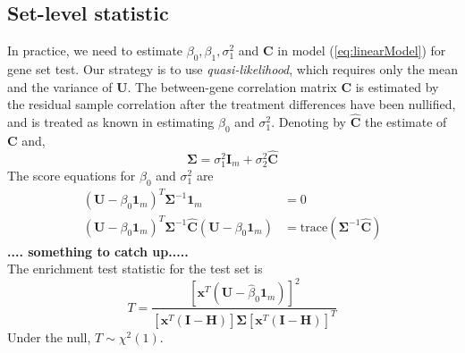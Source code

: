 \documentclass[11pt, a4paper]{article}
\begin{document}
	\subsection*{Set-level statistic}\label{subsection:setlevelstat}
	In practice, we need to estimate $\beta_0, \beta_1,\sigma_1^2$ and $\bm C$ in model (\ref{eq:linearModel}) for gene set test. Our strategy is to use \textit{quasi-likelihood}, which requires only the mean and the variance of $\bm U$.  The between-gene correlation matrix $\bm C$ is estimated by the residual sample correlation after the treatment differences have been nullified, and is treated as known in estimating $\beta_0$ and $\sigma_1^2$. 
	Denoting by $\hat{\bm C}$ the estimate of $\bm C$ and,
	\begin{equation}\label{eq:estimateparameter}
		\bm\Sigma = \sigma^2_1\bm I_m + \sigma_2^2 \hat{\bm C}
	\end{equation}
	The score equations for $\beta_0$ and $\sigma_1^2$ are
	\begin{equation}
		\begin{aligned}
			(\bm U - \beta_0\bm 1_m)^T \bm \Sigma^{-1}\bm 1_m & = 0\\
			(\bm U - \beta_0\bm 1_m)^T \bm \Sigma^{-1} \hat{\bm C} (\bm U - \beta_0\bm 1_m) &= \text{trace}(\bm \Sigma^{-1}\hat{\bm C})
		\end{aligned}
	\end{equation}
	\textbf{.... something to catch up.....}\\
	The enrichment test statistic for the test set is 
	\begin{equation}\label{eq:teststatistic}
		T = \frac{\left[\bm x^T(\bm U - \hat{\beta}_0 \bm 1_m )\right]^2}{\left[\bm x^T(\bm I - \bm H)\right]\bm \Sigma \left[\bm x^T(\bm I - \bm H)\right]^T}
	\end{equation} 
	Under the null, $T\sim \chi^2(1)$.
	
	
\end{document}
